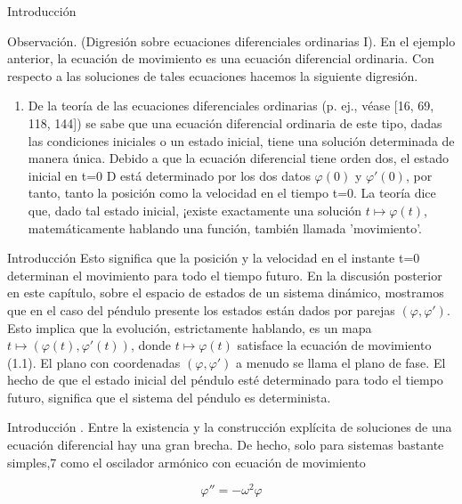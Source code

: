 \documentclass[11pt]{beamer}
\begin{document}
\begin{frame}{Introducción}
			\justifying

Observación. (Digresión sobre ecuaciones diferenciales ordinarias I). En el ejemplo anterior, la ecuación de movimiento es una ecuación diferencial ordinaria. Con respecto a las soluciones de tales ecuaciones hacemos la siguiente digresión.

\begin{enumerate}
\item De la teoría de las ecuaciones diferenciales ordinarias (p. ej., véase [16, 69, 118, 144]) se sabe que una ecuación diferencial ordinaria de este tipo, dadas las condiciones iniciales o un estado inicial, tiene una solución determinada de manera única. Debido a que la ecuación diferencial tiene orden dos, el estado inicial en t=0 D está determinado por los dos datos $\varphi(0)$ y $\varphi'(0)$, por tanto, tanto la posición como la velocidad en el tiempo t=0. La teoría dice que, dado tal estado inicial, ¡existe exactamente una solución $t \mapsto  \varphi(t)$, matemáticamente hablando una función, también llamada 'movimiento'. 



\end{enumerate}
			
\end{frame}

\begin{frame}{Introducción}
			\justifying
Esto significa que la posición y la velocidad en el instante t=0 determinan el movimiento para todo el tiempo futuro. En la discusión posterior en este capítulo, sobre el espacio de estados de un sistema dinámico, mostramos que en el caso del péndulo presente los estados están dados por parejas $(\varphi, \varphi')$. Esto implica que la evolución, estrictamente hablando, es un mapa $t \mapsto (\varphi(t), \varphi'(t))$, donde $t \mapsto  \varphi(t)$ satisface la ecuación de movimiento (1.1). El plano con coordenadas $(\varphi, \varphi')$ a menudo se llama el plano de fase. El hecho de que el estado inicial del péndulo esté determinado para todo el tiempo futuro, significa que el sistema del péndulo es determinista.			
\end{frame}

\begin{frame}{Introducción}
			. Entre la existencia y la construcción explícita de soluciones de una ecuación diferencial hay una gran brecha. De hecho, solo para sistemas bastante simples,7 como el oscilador armónico con ecuación de movimiento

\[
\varphi'' = - \omega^2 \varphi
\]
			
\end{frame}
\end{document}
